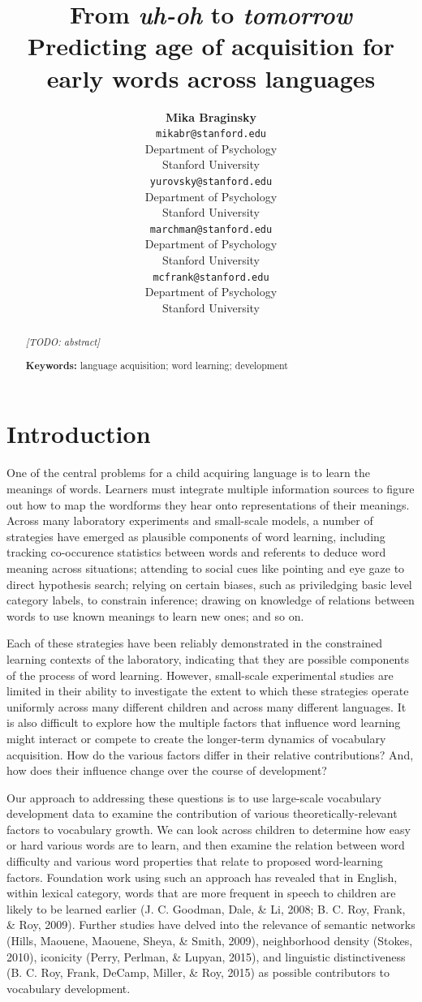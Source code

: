 \documentclass[10pt, letterpaper]{article}
\title{From \emph{uh-oh} to \emph{tomorrow}\\Predicting age of acquisition for
early words across languages}
\author{{\large \bf Mika Braginsky} \\ \texttt{mikabr@stanford.edu} \\ Department of Psychology \\ Stanford University \And {\large \bf Daniel Yurovsky} \\ \texttt{yurovsky@stanford.edu} \\ Department of Psychology \\ Stanford University \And {\large \bf Virginia A. Marchman} \\ \texttt{marchman@stanford.edu} \\ Department of Psychology \\ Stanford University \And {\large \bf Michael C. Frank} \\ \texttt{mcfrank@stanford.edu} \\ Department of Psychology \\ Stanford University}
\begin{document}
\maketitle

\begin{abstract}
\emph{{[}TODO: abstract{]}}

\textbf{Keywords:}
language acquisition; word learning; development
\end{abstract}

\section{Introduction}\label{introduction}

One of the central problems for a child acquiring language is to learn
the meanings of words. Learners must integrate multiple information
sources to figure out how to map the wordforms they hear onto
representations of their meanings. Across many laboratory experiments
and small-scale models, a number of strategies have emerged as plausible
components of word learning, including tracking co-occurence statistics
between words and referents to deduce word meaning across situations;
attending to social cues like pointing and eye gaze to direct hypothesis
search; relying on certain biases, such as priviledging basic level
category labels, to constrain inference; drawing on knowledge of
relations between words to use known meanings to learn new ones; and so
on.

Each of these strategies have been reliably demonstrated in the
constrained learning contexts of the laboratory, indicating that they
are possible components of the process of word learning. However,
small-scale experimental studies are limited in their ability to
investigate the extent to which these strategies operate uniformly
across many different children and across many different languages. It
is also difficult to explore how the multiple factors that influence
word learning might interact or compete to create the longer-term
dynamics of vocabulary acquisition. How do the various factors differ in
their relative contributions? And, how does their influence change over
the course of development?

Our approach to addressing these questions is to use large-scale
vocabulary development data to examine the contribution of various
theoretically-relevant factors to vocabulary growth. We can look across
children to determine how easy or hard various words are to learn, and
then examine the relation between word difficulty and various word
properties that relate to proposed word-learning factors. Foundation
work using such an approach has revealed that in English, within lexical
category, words that are more frequent in speech to children are likely
to be learned earlier (J. C. Goodman, Dale, \& Li, 2008; B. C. Roy,
Frank, \& Roy, 2009). Further studies have delved into the relevance of
semantic networks (Hills, Maouene, Maouene, Sheya, \& Smith, 2009),
neighborhood density (Stokes, 2010), iconicity (Perry, Perlman, \&
Lupyan, 2015), and linguistic distinctiveness (B. C. Roy, Frank, DeCamp,
Miller, \& Roy, 2015) as possible contributors to vocabulary
development.
\end{document}
